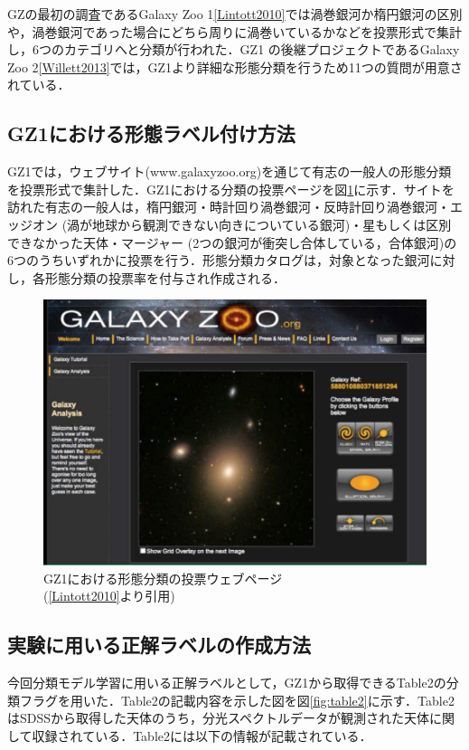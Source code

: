 \documentclass[a4j, 11pt]{jreport}
\begin{document}
GZの最初の調査であるGalaxy Zoo 1\ref{Lintott2010}では渦巻銀河か楕円銀河の区別や，渦巻銀河であった場合にどちら周りに渦巻いているかなどを投票形式で集計し，6つのカテゴリへと分類が行われた．GZ1 の後継プロジェクトであるGalaxy Zoo 2\ref{Willett2013}では，GZ1より詳細な形態分類を行うため11つの質問が用意されている．

\subsection*{GZ1における形態ラベル付け方法}
GZ1では，ウェブサイト(www.galaxyzoo.org)を通じて有志の一般人の形態分類を投票形式で集計した．GZ1における分類の投票ページを図\ref{fig:gz1_website}に示す．サイトを訪れた有志の一般人は，楕円銀河・時計回り渦巻銀河・反時計回り渦巻銀河・エッジオン (渦が地球から観測できない向きについている銀河)・星もしくは区別できなかった天体・マージャー (2つの銀河が衝突し合体している，合体銀河)の6つのうちいずれかに投票を行う．形態分類カタログは，対象となった銀河に対し，各形態分類の投票率を付与され作成される．

\begin{figure}[h]
 \centering
 \includegraphics[width=12cm]{images/gz1_website.png}
 \caption{GZ1における形態分類の投票ウェブページ\\(\ref{Lintott2010}より引用)}
 \label{fig:gz1_website}
\end{figure}

\subsection*{実験に用いる正解ラベルの作成方法}
今回分類モデル学習に用いる正解ラベルとして，GZ1から取得できるTable2の分類フラグを用いた．Table2の記載内容を示した図を図\ref{fig:table2}に示す．Table2はSDSSから取得した天体のうち，分光スペクトルデータが観測された天体に関して収録されている．Table2には以下の情報が記載されている．
\end{document}
